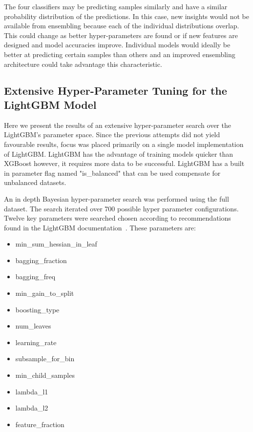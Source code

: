 \documentclass[journal,twoside,web]{ieeecolor}
\begin{document}
The four classifiers may be predicting samples similarly and have a similar probability distribution of the predictions. In this case, new insights would not be available from ensembling because each of the individual distributions overlap. This could change as better hyper-parameters are found or if new features are designed and model accuracies improve. Individual models would ideally be better at predicting certain samples than others and an improved ensembling architecture could take advantage this characteristic.

\subsection{Extensive Hyper-Parameter Tuning for the LightGBM Model}
Here we present the results of an extensive hyper-parameter search over the LightGBM's parameter space. Since the previous attempts did not yield favourable results, focus was placed primarily on a single model implementation of LightGBM. LightGBM has the advantage of training models quicker than XGBoost however, it requires more data to be successful. LightGBM has a built in parameter flag named "is\_balanced" that can be used compensate for unbalanced datasets.

An in depth Bayesian hyper-parameter search was performed using the full dataset. The search iterated over 700 possible hyper parameter configurations. Twelve key parameters were searched chosen according to recommendations found in the LightGBM documentation~\cite{lightgbm_documentation}. These parameters are:
\begin{itemize}
\item min_sum_hessian_in_leaf
\item bagging_fraction
\item bagging_freq
\item min_gain_to_split
\item boosting_type
\item num_leaves
\item learning_rate
\item subsample_for_bin
\item min_child_samples
\item lambda_l1
\item lambda_l2
\item feature_fraction
\end{itemize}






\end{document}
